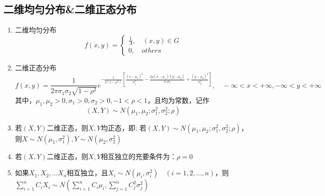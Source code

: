 \subsection{二维均匀分布\&二维正态分布}
\begin{enumerate}
	\item 二维均匀分布
		\[ f(x, y)=\begin{cases}
			\frac{1}{A}, \quad (x, y) \in G \\
			0, \quad others
		\end{cases} \]

	\item 二维正态分布
	\begin{equation}
		f(x,y) = \frac{1}{2\pi \sigma_1 \sigma_2 \sqrt{1-\rho^2}}e^{-\frac{1}{2(1-\rho^2)}\left[ \frac{(x-\mu_1)^2}{\sigma_1^2} - \frac{2\rho(x-\mu_1)(y-\mu_2)}{\sigma_1 \sigma_2} + \frac{(y-\mu_2)^2}{\sigma_2^2} \right]}, \quad -\infty<x<+\infty, -\infty<y<+\infty
	\end{equation}
	其中，$\mu_1, \mu_2 > 0, \sigma_1>0, \sigma_2 > 0, -1<\rho < 1$，且均为常数，记作
	\begin{equation}
		(X,Y) \sim N(\mu_1, \mu_2; \sigma_1^2, \sigma_2^2; \rho)
	\end{equation}

	\item 若$(X,Y)$二维正态，则$X, Y$均正态，即: 若$(X, Y) \sim N(\mu_1, \mu_2; \sigma_1^2, \sigma_2^2; \rho)$，则$X \sim N(\mu_1, \sigma_1^2), Y \sim N(\mu_2, \sigma_2^2)$
	
	\item 若$(X,Y)$二维正态，则$X, Y$相互独立的充要条件为：$\rho = 0$

	\item 如果$X_1, X_2, \dots X_n$相互独立，且$X_i \sim N(\mu_i, \sigma_i^2) \quad (i = 1, 2, \dots, n)$，则$\sum_{i=1}^{n}C_iX_i \sim N(\sum_{i=1}^{n}C_i\mu_i, \sum_{j=1}^{n}C_j^2\sigma_j^2)$
\end{enumerate}



